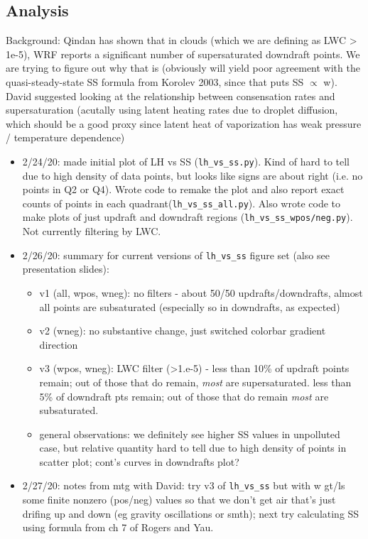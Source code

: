 \documentclass{article}
\begin{document}
\subsection{Analysis}
Background: Qindan has shown that in clouds (which we are defining as LWC > 1e-5), WRF reports a significant number of supersaturated downdraft points. We are trying to figure out why that is (obviously will yield poor agreement with the quasi-steady-state SS formula from Korolev 2003, since that puts SS $\propto$ w). David suggested looking at the relationship between consensation rates and supersaturation (acutally using latent heating rates due to droplet diffusion, which should be a good proxy since latent heat of vaporization has weak pressure / temperature dependence)
\begin{itemize}
	\item 2/24/20: made initial plot of LH vs SS (\texttt{lh\_vs\_ss.py}). Kind of hard to tell due to high density of data points, but looks like signs are about right (i.e. no points in Q2 or Q4). Wrote code to remake the plot and also report exact counts of points in each quadrant(\texttt{lh\_vs\_ss\_all.py}). Also wrote code to make plots of just updraft and downdraft regions (\texttt{lh\_vs\_ss\_wpos/neg.py}). Not currently filtering by LWC.
	\item 2/26/20: summary for current versions of \texttt{lh\_vs\_ss} figure set (also see presentation slides):
	\begin{itemize}
		\item v1 (all, wpos, wneg): no filters - about 50/50 updrafts/downdrafts, almost all points are subsaturated (especially so in downdrafts, as expected)
		\item v2 (wneg): no substantive change, just switched colorbar gradient direction
		\item v3 (wpos, wneg): LWC filter (>1.e-5) - less than 10\% of updraft points remain; out of those that do remain, \emph{most} are supersaturated. less than 5\% of downdraft pts remain; out of those that do remain \emph{most} are subsaturated. 
		\item general observations: we definitely see higher SS values in unpolluted case, but relative quantity hard to tell due to high density of points in scatter plot; cont's curves in downdrafts plot?
	\end{itemize}
	\item 2/27/20: notes from mtg with David: try v3 of \texttt{lh\_vs\_ss} but with w gt/ls some finite nonzero (pos/neg) values so that we don't get air that's just drifing up and down (eg gravity oscillations or smth); next try calculating SS using formula from ch 7 of Rogers and Yau. 

\end{itemize}
\end{document}
